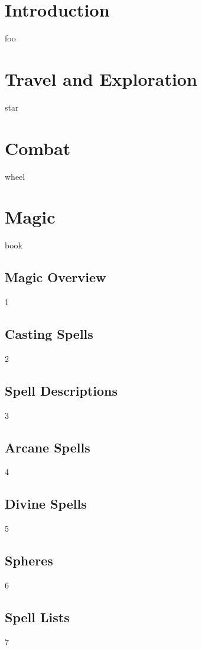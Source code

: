 \documentclass[12pt,twoside,onecolumn,openany,final]{memoir}
\begin{document}


\clearpage
\chapter{Introduction}
foo








\chapter{Travel and Exploration}
star
\chapter{Combat}
wheel
\chapter{Magic}
book
\section{Magic Overview} 1
\section{Casting Spells} 2
\section{Spell Descriptions} 3
\section{Arcane Spells} 4
\section{Divine Spells} 5
\section{Spheres} 6
\section{Spell Lists} 7
\end{document}
